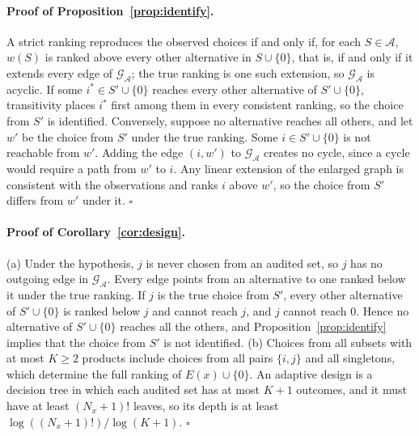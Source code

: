 \documentclass[opre,dblanonrev]{informs4}
\providecommand{\1}{\mathbf{1}}
\begin{document}
\begin{APPENDICES}
\paragraph{Proof of Proposition~\ref{prop:identify}.}
A strict ranking reproduces the observed choices if and only if, for each $S\in\mathcal A$, $w(S)$ is ranked above every other alternative in $S\cup\{0\}$, that is, if and only if it extends every edge of $\mathcal G_{\mathcal A}$; the true ranking is one such extension, so $\mathcal G_{\mathcal A}$ is acyclic. If some $i^\ast\in S'\cup\{0\}$ reaches every other alternative of $S'\cup\{0\}$, transitivity places $i^\ast$ first among them in every consistent ranking, so the choice from $S'$ is identified. Conversely, suppose no alternative reaches all others, and let $w'$ be the choice from $S'$ under the true ranking. Some $i\in S'\cup\{0\}$ is not reachable from $w'$. Adding the edge $(i,w')$ to $\mathcal G_{\mathcal A}$ creates no cycle, since a cycle would require a path from $w'$ to $i$. Any linear extension of the enlarged graph is consistent with the observations and ranks $i$ above $w'$, so the choice from $S'$ differs from $w'$ under it. \hfill$\square$

\paragraph{Proof of Corollary~\ref{cor:design}.}
(a) Under the hypothesis, $j$ is never chosen from an audited set, so $j$ has no outgoing edge in $\mathcal G_{\mathcal A}$. Every edge points from an alternative to one ranked below it under the true ranking. If $j$ is the true choice from $S'$, every other alternative of $S'\cup\{0\}$ is ranked below $j$ and cannot reach $j$, and $j$ cannot reach $0$. Hence no alternative of $S'\cup\{0\}$ reaches all the others, and Proposition~\ref{prop:identify} implies that the choice from $S'$ is not identified.
(b) Choices from all subsets with at most $K\ge2$ products include choices from all pairs $\{i,j\}$ and all singletons, which determine the full ranking of $E(x)\cup\{0\}$. An adaptive design is a decision tree in which each audited set has at most $K+1$ outcomes, and it must have at least $(N_x+1)!$ leaves, so its depth is at least $\log((N_x+1)!)/\log(K+1)$. \hfill$\square$


\end{APPENDICES}
\end{document}
